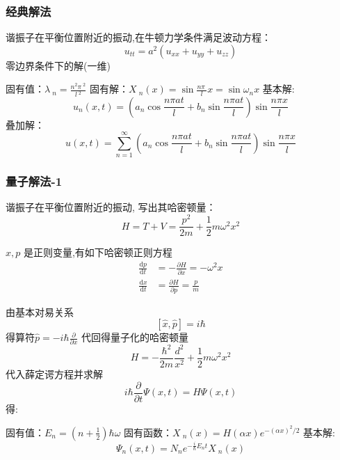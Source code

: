 \subsubsection{经典解法}
谐振子在平衡位置附近的振动,在牛顿力学条件满足波动方程：
\begin{equation*}
    u_{tt}=a^2(u_{xx}+ u_{yy}+u_{zz})
\end{equation*}
零边界条件下的解(一维)
\begin{enumerate}
    \IItem 固有值：$\displaystyle  \lambda~_n=\frac{n^2\pi~^2}{l~^2}$ 
    \IItem 固有解：{\large $\displaystyle  X~_n(x)=\sin \frac{n\pi~}{l} x=\sin \omega_n x $}
    \IItem 基本解:
    \[u_n(x,t) = (a_n\cos\frac{ n\pi at}{l}+ b_n\sin \frac{ n\pi at}{l}) \sin \frac{ n\pi x}{l} \] 
    \IItem 叠加解：
    \[u(x,t) = \sum\limits_{n=1}^{\infty }  (a_n\cos\frac{ n\pi at}{l}+ b_n\sin \frac{ n\pi at}{l}) \sin \frac{ n\pi x}{l}\]
\end{enumerate}

\subsubsection{量子解法-1}
谐振子在平衡位置附近的振动, 写出其哈密顿量：
\[ H= T+V = \frac{p^2}{2m} +\frac{1}{2} m\omega ^2 x^2 \]

$x, p$ 是正则变量,有如下哈密顿正则方程
\[ \begin{aligned}
    \frac{\mathrm{d}p}{\mathrm{d}t} &= - \frac{\partial H}{\partial x} = - \omega ^2 x\\ 
    \frac{\mathrm{d}x}{\mathrm{d}t} &= \frac{\partial H}{\partial p} = \frac{p}{m}
  \end{aligned} \]

由基本对易关系
\[[\hat{x},\hat{p}]=i\hbar\]
得算符$\hat{p}=-i\hbar \frac{\partial }{\partial x}$
代回得量子化的哈密顿量  \[ H= -\frac{\hbar^2}{2m } \frac{d ^2}{x^2} + \frac{1}{2} m \omega ^2 x^2 \] 
代入薛定谔方程并求解 
\[i\hbar \frac{\partial }{\partial t} \Psi (x,t ) =H \Psi (x, t ) \]
得:
\begin{enumerate}
    \IItem 固有值：$\displaystyle  E_n=(n+\frac{1}{2})\hbar \omega $ 
    \IItem 固有函数：{$\displaystyle  X~_n(x)= H(\alpha x) e^{-(\alpha x)^2 /2 } $}
    \IItem 基本解:
    \[ \Psi_n(x,t) = N_n e^{-\frac{i}{\hbar} E_n t } X~_n(x)\]  
\end{enumerate}

